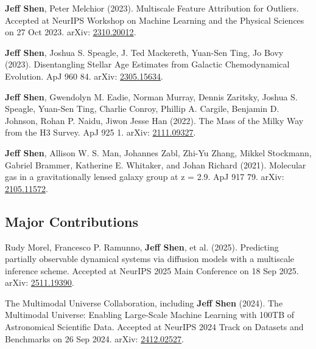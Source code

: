 \documentclass[10pt]{extarticle}
\begin{document}
\begin{etaremune}
\item \textbf{Jeff Shen}, Peter Melchior (2023). Multiscale Feature Attribution for Outliers. Accepted at NeurIPS Workshop on Machine Learning and the Physical Sciences on 27 Oct 2023. arXiv: \href{https://arxiv.org/abs/2310.20012}{2310.20012}.
\item \textbf{Jeff Shen}, Joshua S. Speagle, J. Ted Mackereth, Yuan-Sen Ting, Jo Bovy (2023). Disentangling Stellar Age Estimates from Galactic Chemodynamical Evolution. ApJ 960 84. arXiv: \href{https://arxiv.org/abs/2305.15634}{2305.15634}.
\item \textbf{Jeff Shen}, Gwendolyn M. Eadie, Norman Murray, Dennis Zaritsky, Joshua S. Speagle, Yuan-Sen Ting, Charlie Conroy, Phillip A. Cargile, Benjamin D. Johnson, Rohan P. Naidu, Jiwon Jesse Han (2022). The Mass of the Milky Way from the H3 Survey. ApJ 925 1. arXiv: \href{https://arxiv.org/abs/2111.09327}{2111.09327}.
\item \textbf{Jeff Shen}, Allison W. S. Man, Johannes Zabl, Zhi-Yu Zhang, Mikkel Stockmann, Gabriel Brammer, Katherine E. Whitaker, and Johan Richard (2021). Molecular gas in a gravitationally lensed galaxy group at z = 2.9. ApJ 917 79. arXiv: \href{https://arxiv.org/abs/2105.11572}{2105.11572}.
\end{etaremune}

\vspace{-6mm}
\subsection*{Major Contributions}

\begin{etaremune}
\item Rudy Morel, Francesco P. Ramunno, \textbf{Jeff Shen}, et al. (2025). Predicting partially observable dynamical systems via diffusion models with a multiscale inference scheme. Accepted at NeurIPS 2025 Main Conference on 18 Sep 2025. arXiv: \href{https://www.arxiv.org/abs/2511.19390}{2511.19390}.
\item The Multimodal Universe Collaboration, including \textbf{Jeff Shen} (2024). The Multimodal Universe: Enabling Large-Scale Machine Learning with 100TB of Astronomical Scientific Data. Accepted at NeurIPS 2024 Track on Datasets and Benchmarks on 26 Sep 2024. arXiv: \href{https://arxiv.org/abs/2412.02527}{2412.02527}.
\end{etaremune}

\vspace{-5mm}
\end{document}
